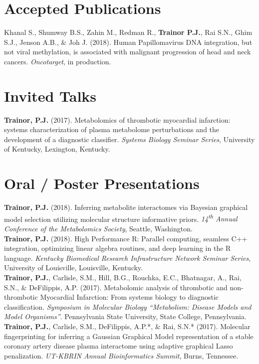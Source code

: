 {\section*{Accepted Publications}
Khanal S., Shumway B.S., Zahin M., Redman R., \textbf{Trainor P.J.}, Rai S.N., Ghim S.J., Jenson A.B., \& Joh J. (2018). Human Papillomavirus DNA integration, but not viral methylation, is associated with malignant progression of head and neck cancers. \emph{Oncotarget}, in production.

\section*{Invited Talks}
\textbf{Trainor, P.J.} (2017). Metabolomics of thrombotic myocardial infarction: systems characterization of plasma metabolome perturbations and the development of a diagnostic classifier. \emph{Systems Biology Seminar Series}, University of Kentucky, Lexington, Kentucky.

\section*{Oral / Poster Presentations}
\textbf{Trainor, P.J.} (2018). Inferring metabolite interactomes via Bayesian graphical model selection utilizing molecular structure informative priors. \emph{14\textsuperscript{th} Annual Conference of the Metabolomics Society}, Seattle, Washington.  \\ 

\textbf{Trainor, P.J.} (2018). High Performance R: Parallel computing, seamless C++ integration, optimizing linear algebra routines, and deep learning in the R language. \emph{Kentucky Biomedical Research Infrastructure Network Seminar Series}, University of Louisville, Louisville, Kentucky.  \\ 

\textbf{Trainor, P.J.}, Carlisle, S.M., Hill, B.G., Rouchka, E.C., Bhatnagar, A., Rai, S.N., \& DeFilippis, A.P. (2017). Metabolomic analysis of thrombotic and non-thrombotic Myocardial Infarction: From systems biology to diagnostic classification. \emph{Symposium in Molecular Biology ``Metabolism: Disease Models and Model Organisms''}. Pennsylvania State University, State College, Pennsylvania.  \\ 

\textbf{Trainor, P.J.}, Carlisle, S.M., DeFilippis, A.P.*, \& Rai, S.N.* (2017). Molecular fingerprinting for inferring a Gaussian Graphical Model representation of a stable coronary artery disease plasma interactome using adaptive graphical Lasso penalization. \emph{UT-KBRIN Annual Bioinformatics Summit}, Burns, Tennessee.  \\ 

}
